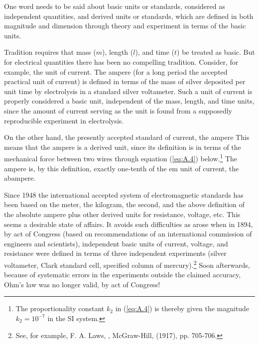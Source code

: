 One word needs to be said about basic units or standards, considered as independent quantities, and derived units or standards, which are defined in both magnitude and dimension through theory and experiment in terms of the basic units. 

Tradition requires that mass ($m$), length ($l$), and time ($t$) be treated as basic. But for electrical quantities there has been no compelling tradition. Consider, for example, the unit of current. The  ampere (for a long period the accepted practical unit of current) is defined in terms of the mass of silver deposited per unit time by electrolysis in a standard silver voltameter. Such a unit of current is properly considered a basic unit, independent of the mass, length, and time units, since the amount of current serving as the unit is found from a supposedly reproducible experiment in electrolysis. 

On the other hand, the presently accepted standard of current, the  ampere 
This means that the  ampere is a derived unit, since its definition is in terms of the mechanical force between two wires through equation (\ref{eq:A.4}) below.\footnote[1]{The proportionality constant $k_2$ in (\ref{eq:A.4}) is thereby given the magnitude $k_2 = 10^{-7}$ in the SI system.} The  ampere is, by this definition, exactly one-tenth of the em unit of current, the abampere.

Since 1948 the international accepted system of electromagnetic standards has been based on the meter, the kilogram, the second, and the above definition of the absolute ampere plus other derived units for resistance, voltage, etc. This seems a desirable state of affairs. It avoids such difficulties as arose when in 1894, by act of Congress (based on recommendations of an international commission of engineers and scientists), independent basic units of current, voltage, and resistance were defined in terms of three independent experiments (silver voltameter, Clark standard cell, specified column of mercury).\footnote[2]{See, for example, F. A. Laws, , McGraw-Hill, (1917), pp. 705-706.} Soon afterwards, because of systematic errors in the experiments outside the claimed accuracy, Ohm's law was no longer valid, by act of Congress!
 
